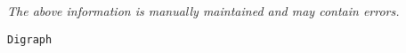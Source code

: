 \label{pkg:digraph}

{\tiny \it The above information is manually maintained and may contain errors.}
\begin{verbatim}
Digraph
\end{verbatim}
